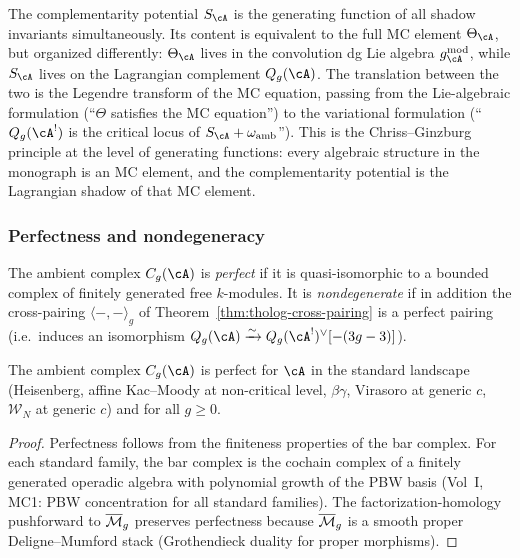 \begin{remark}
The complementarity potential $S_\cA$ is the generating
function of all shadow invariants simultaneously.
Its content is equivalent to the full MC element $\Theta_\cA$,
but organized differently: $\Theta_\cA$ lives in the
convolution dg Lie algebra $g_\cA^{\mathrm{mod}}$, while
$S_\cA$ lives on the Lagrangian complement $Q_g(\cA)$.
The translation between the two is the Legendre transform
of the MC equation, passing from the Lie-algebraic
formulation (``$\Theta$ satisfies the MC equation'') to
the variational formulation (``$Q_g(\cA^!)$ is the critical
locus of $S_\cA + \omega_{\mathrm{amb}}$'').
This is the Chriss--Ginzburg principle at the level of
generating functions: every algebraic structure in the
monograph is an MC element, and the complementarity potential
is the Lagrangian shadow of that MC element.
\end{remark}

\subsubsection{Perfectness and nondegeneracy}

\begin{definition}
The ambient complex $C_g(\cA)$ is \emph{perfect} if it is
quasi-isomorphic to a bounded complex of finitely generated
free $k$-modules.
It is \emph{nondegenerate} if in addition the cross-pairing
$\langle -, - \rangle_g$ of
Theorem~\ref{thm:tholog-cross-pairing}
is a perfect pairing (i.e.\ induces an isomorphism
$Q_g(\cA) \xrightarrow{\sim} Q_g(\cA^!)^\vee[-(3g-3)]$).
\end{definition}

\begin{proposition}
The ambient complex $C_g(\cA)$ is perfect for $\cA$ in the
standard landscape (Heisenberg, affine Kac--Moody at
non-critical level, $\beta\gamma$, Virasoro at generic $c$,
$\mathcal{W}_N$ at generic $c$) and for all $g \geq 0$.
\end{proposition}

\begin{proof}
Perfectness follows from the finiteness properties of the
bar complex.
For each standard family, the bar complex is the cochain complex
of a finitely generated operadic algebra with polynomial growth
of the PBW basis (Vol~I, MC1: PBW concentration for all standard
families).
The factorization-homology pushforward to $\overline{\mathcal{M}}_g$ preserves
perfectness because $\overline{\mathcal{M}}_g$ is a smooth proper
Deligne--Mumford stack (Grothendieck duality for proper morphisms).
\end{proof}

